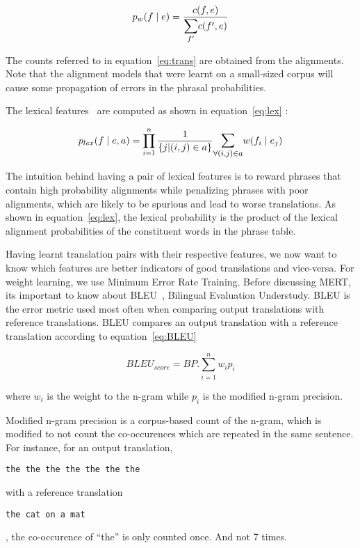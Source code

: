 \begin{equation} \label{eq:trans}
	p_{w}(f \mid e) = \frac{c(f, e)}{\mathlarger{\sum\limits_{f'}}c(f', e)}
\end{equation}

The counts referred to in equation~\eqref{eq:trans} are obtained from the alignments. Note that the alignment models that were learnt on a small-sized corpus will cause some propagation of errors in the phrasal probabilities. 

The lexical features~\cite{Koehn:03} are computed as shown in equation~\eqref{eq:lex} : 

\begin{equation} \label{eq:lex}
	p_{lex}(f \mid e, a) = \prod\limits_{i=1}^{n} \frac{1}{\{j | (i,j) \in a\}}
	\mathlarger{\sum\limits_{\forall (i,j) \in a}} w(f_{i} \mid e_{j})
\end{equation}


The intuition behind having a pair of lexical features is to reward phrases that contain high probability alignments while penalizing phrases with poor alignments, which are likely to be spurious and lead to worse translations. As shown in equation~\eqref{eq:lex}, the lexical probability is the product of the lexical alignment probabilities of the constituent words in the phrase table. 


Having learnt translation pairs with their respective features, we now want to know which features are better indicators of good translations and vice-versa. For weight learning, we use Minimum Error Rate Training. Before discussing MERT, its important to know about BLEU~\cite{Papineni:02}, Bilingual Evaluation Understudy. BLEU is the error metric used most often when comparing output translations with reference translations. BLEU compares an output translation with a reference translation according to equation~\eqref{eq:BLEU}

\begin{equation} \label{eq:BLEU}
	BLEU_{score} = BP. \sum\limits_{i=1}^n w_{i}p_{i}
\end{equation}

where $w_{i}$ is the weight to the n-gram while $p_{i}$ is the modified n-gram precision. 

Modified n-gram precision is a corpus-based count of the n-gram, which is modified to not count the co-occurences which are repeated in the same sentence. For instance, for an output translation, \begin{verbatim}the the the the the the the\end{verbatim} with a reference translation \begin{verbatim}the cat on a mat\end{verbatim}, the co-occurence of ``the'' is only counted once. And not 7 times. 

